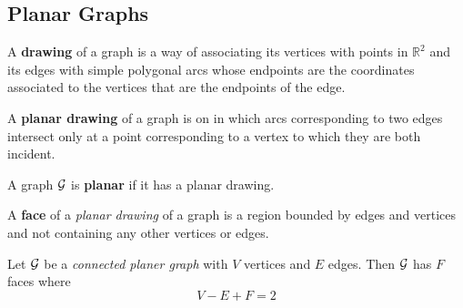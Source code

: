 \documentclass{article}
\def\R{{\mathbb R}}
\begin{document}
		
		\subsection{Planar Graphs}
			\begin{definition}
				A \textbf{drawing} of a graph is a way of associating its vertices with points in $\R^2$ and its edges with simple polygonal arcs whose endpoints are the coordinates associated to the vertices that are the endpoints of the edge.
			\end{definition}
			
			\begin{definition}
				A \textbf{planar drawing} of a graph is on in which arcs corresponding to two edges intersect only at a point corresponding to a vertex to which they are both incident.
			\end{definition}

			\begin{definition}
				A graph $\mathcal{{G}}$ is \textbf{planar} if it has a planar drawing.
			\end{definition}
			
			\begin{definition}
				A \textbf{face} of a \emph{planar drawing} of a graph is a region bounded by edges and vertices and not containing any other vertices or edges.
			\end{definition}

			\begin{theorem}
				Let $\mathcal{{G}}$ be a \emph{connected planer graph} with $V$ vertices and $E$ edges. Then $\mathcal{{G}}$ has $F$ faces where 
				\begin{equation}
					V - E + F = 2
				\end{equation}
			\end{theorem}
			
\end{document}
